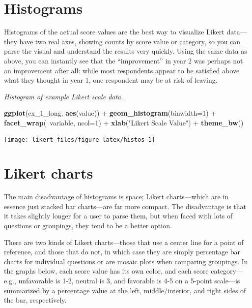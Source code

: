 \documentclass[]{book}
\newenvironment{Shaded}{\begin{snugshade}}{\end{snugshade}}
\newcommand{\KeywordTok}[1]{\textcolor[rgb]{0.13,0.29,0.53}{\textbf{{#1}}}}
\newcommand{\DataTypeTok}[1]{\textcolor[rgb]{0.13,0.29,0.53}{{#1}}}
\newcommand{\DecValTok}[1]{\textcolor[rgb]{0.00,0.00,0.81}{{#1}}}
\newcommand{\StringTok}[1]{\textcolor[rgb]{0.31,0.60,0.02}{{#1}}}
\newcommand{\NormalTok}[1]{{#1}}
\begin{document}
\section{Histograms}\label{histograms}

Histograms of the actual score values are the best way to visualize
Likert data---they have two real axes, showing counts by score value or
category, so you can parse the visual and understand the results very
quickly. Using the same data as above, you can instantly see that the
``improvement'' in year 2 was perhaps not an improvement after all:
while most respondents appear to be satisfied above what they thought in
year 1, one respondent may be at risk of leaving.

\emph{Histogram of example Likert scale data.}

\begin{Shaded}
\begin{Highlighting}[]
\KeywordTok{ggplot}\NormalTok{(ex_1_long, }\KeywordTok{aes}\NormalTok{(value)) +}
\StringTok{    }\KeywordTok{geom_histogram}\NormalTok{(}\DataTypeTok{binwidth=}\DecValTok{1}\NormalTok{) +}
\StringTok{    }\KeywordTok{facet_wrap}\NormalTok{(~variable, }\DataTypeTok{ncol=}\DecValTok{1}\NormalTok{) +}
\StringTok{    }\KeywordTok{xlab}\NormalTok{(}\StringTok{"Likert Scale Value"}\NormalTok{) +}
\StringTok{    }\KeywordTok{theme_bw}\NormalTok{()}
\end{Highlighting}
\end{Shaded}

\begin{center}\texttt{[image: likert\_files/figure-latex/histos-1]} \end{center}

\section{Likert charts}\label{likert-charts}

The main disadvantage of histograms is space; Likert charts---which are
in essence just stacked bar charts---are far more compact. The
disadvantage is that it takes slightly longer for a user to parse them,
but when faced with lots of questions or groupings, they tend to be a
better option.

There are two kinds of Likert charts---those that use a center line for
a point of reference, and those that do not, in which case they are
simply percentage bar charts for individual questions or are mosaic
plots when comparing groupings. In the graphs below, each score value
has its own color, and each score category---e.g., unfavorable is 1-2,
neutral is 3, and favorable is 4-5 on a 5-point scale---is summarized by
a percentage value at the left, middle/interior, and right sides of the
bar, respectively.
\end{document}
